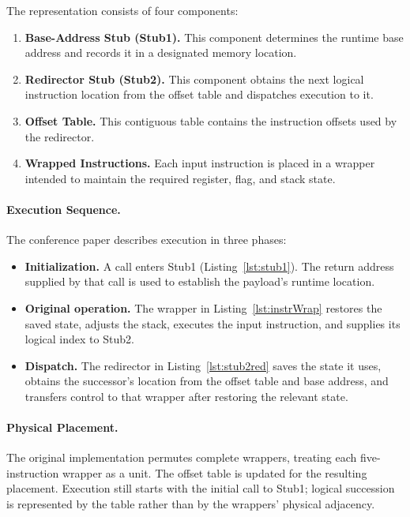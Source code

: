 \documentclass[runningheads]{llncs}
\begin{document}
The representation consists of four components:

\begin{enumerate}
  \item \textbf{Base-Address Stub (Stub1).}
This component determines the runtime base address and records it in a designated memory location.

  \item \textbf{Redirector Stub (Stub2).}
This component obtains the next logical instruction location from the offset table and dispatches execution to it.

  \item \textbf{Offset Table.}
This contiguous table contains the instruction offsets used by the redirector.

  \item \textbf{Wrapped Instructions.}
Each input instruction is placed in a wrapper intended to maintain the required register, flag, and stack state.
\end{enumerate}

\paragraph{Execution Sequence.}
The conference paper describes execution in three phases:
\begin{itemize}
    \item \textbf{Initialization.} A call enters Stub1 (Listing~\ref{lst:stub1}). The return address supplied by that call is used to establish the payload's runtime location.
    \item \textbf{Original operation.} The wrapper in Listing~\ref{lst:instrWrap} restores the saved state, adjusts the stack, executes the input instruction, and supplies its logical index to Stub2.
    \item \textbf{Dispatch.} The redirector in Listing~\ref{lst:stub2red} saves the state it uses, obtains the successor's location from the offset table and base address, and transfers control to that wrapper after restoring the relevant state.

\end{itemize}

\paragraph{Physical Placement.}
The original implementation permutes complete wrappers, treating each five-instruction wrapper as a unit. The offset table is updated for the resulting placement. Execution still starts with the initial call to Stub1; logical succession is represented by the table rather than by the wrappers' physical adjacency.
\end{document}
